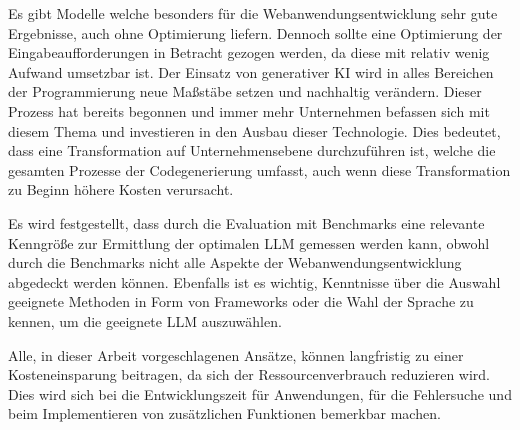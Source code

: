Es gibt Modelle welche besonders für die Webanwendungsentwicklung sehr gute Ergebnisse, auch ohne Optimierung liefern. Dennoch sollte eine Optimierung der Eingabeaufforderungen in Betracht gezogen werden, da diese mit relativ wenig Aufwand umsetzbar ist. Der Einsatz von generativer KI wird in alles Bereichen der Programmierung neue Maßstäbe setzen und nachhaltig verändern. Dieser Prozess hat bereits begonnen und immer mehr Unternehmen befassen sich mit diesem Thema und investieren in den Ausbau dieser Technologie. Dies bedeutet, dass eine Transformation auf Unternehmensebene durchzuführen ist, welche die gesamten Prozesse der Codegenerierung umfasst, auch wenn diese Transformation zu Beginn höhere Kosten verursacht.\vspace{0.2cm}

Es wird festgestellt, dass durch die Evaluation mit Benchmarks eine relevante Kenngröße zur Ermittlung der optimalen LLM gemessen werden kann, obwohl durch die Benchmarks nicht alle Aspekte der Webanwendungsentwicklung abgedeckt werden können. Ebenfalls ist es wichtig, Kenntnisse über die Auswahl geeignete Methoden in Form von Frameworks oder die Wahl der Sprache zu kennen, um die geeignete LLM auszuwählen.\vspace{0.2cm}

Alle, in dieser Arbeit vorgeschlagenen Ansätze, können langfristig zu einer Kosteneinsparung beitragen, da sich der Ressourcenverbrauch reduzieren wird. Dies wird sich bei die Entwicklungszeit für Anwendungen, für die Fehlersuche und beim Implementieren von zusätzlichen Funktionen bemerkbar machen.